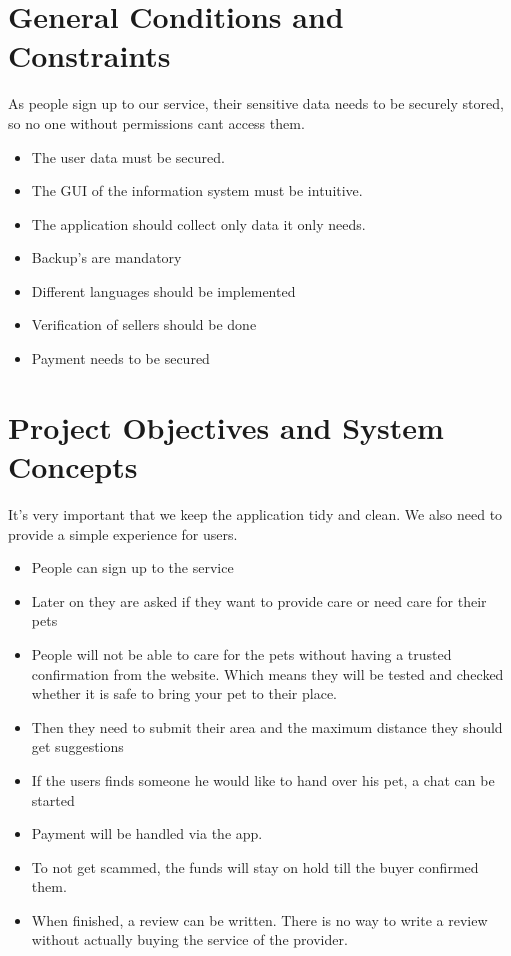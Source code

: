 \documentclass[12pt]{article}
\theoremstyle{definition}
\newenvironment{explanation}{%
   \setlength{\parindent}{0pt}
   \itshape
   \color{blue}
}{}
\begin{document}
\section{General Conditions and Constraints}
As people sign up to our service, their sensitive data needs to be securely stored, so no one without permissions cant access them.
\begin{itemize}
\item The user data must be secured.
\item The GUI of the information system must be intuitive.
\item The application should collect only data it only needs.
\item Backup's are mandatory
\item Different languages should be implemented
\item Verification of sellers should be done
\item Payment needs to be secured
\end{itemize}

\pagebreak

\section{Project Objectives and System Concepts}
\begin{explanation}
It's very important that we keep the application tidy and clean. We also need to provide a simple experience for users.
\end{explanation}

\begin{itemize}
\item People can sign up to the service 
\item Later on they are asked if they want to provide care or need care for their pets
\item People will not be able to care for the pets without having a trusted confirmation from the website. Which means they will be tested and checked whether it is safe to bring your pet to their place.
\item Then they need to submit their area and the maximum distance they should get suggestions
\item If the users finds someone he would like to hand over his pet, a chat can be started
\item Payment will be handled via the app.
\item To not get scammed, the funds will stay on hold till the buyer confirmed them.
\item When finished, a review can be written. There is no way to write a review without actually buying the service of the provider.
\end{itemize}
\end{document}

